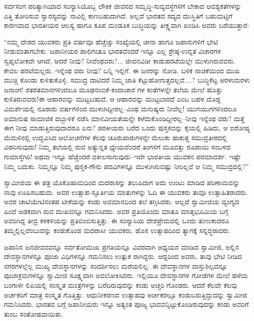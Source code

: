 ಸರ್ವಸಂಗ ಪರಿತ್ಯಾಗಿಯಾದ ಸಂನ್ಯಾಸಿಯೊಬ್ಬ ಲೌಕಿಕ ಜೀವನದ ಸಮೃದ್ಧಿ-ಸುವ್ಯವಸ್ಥೆಗಳಿಗೆ ಬೇಕಾದ ಆವಶ್ಯಕತೆಗಳನ್ನು ಎತ್ತಿ ತೋರಿಸುವ ಸ್ವಾರಸ್ಯವನ್ನು ನಾವಿಲ್ಲಿ ಕಾಣಬಹುದಾಗಿದೆ. ಅಲ್ಲದೆ ಭಾರತದ ಸದ್ಯದ ದುಃಸ್ಥಿತಿಗೆ ಬಹುಮಟ್ಟಿಗೆ ಕಾರಣವಾದ ಭಾರತೀಯರ ಆಲಸ್ಯ ಹಾಗೂ ಕೂಪ ಮಂಡೂಕ ಬುದ್ಧಿಯನ್ನು ತೀಕ್ಷ್ಣವಾಗಿ ಖಂಡಿಸಿ ಅವರು ಬರೆಯುತ್ತಾರೆ:

“ನಮ್ಮ ದೇಶದ ಯುವಕರು ಪ್ರತಿ ವರ್ಷವೂ ಹೆಚ್ಚೆಚ್ಚು ಸಂಖ್ಯೆಯಲ್ಲಿ ಚೀನಾ ಹಾಗೂ ಜಪಾನುಗಳಿಗೆ ಭೇಟಿ ನೀಡುವಂತಾಗಬೇಕು. ಜಪಾನೀಯರ ಪಾಲಿಗಂತೂ ಭಾರತವೆಂದರೆ ಇನ್ನೂ ಎಲ್ಲ ಶ್ರೇಷ್ಠ-ಉನ್ನತ ವಿಚಾರಗಳ ಸ್ವಪ್ನಲೋಕವೇ ಆಗಿದೆ. ಆದರೆ ನೀವು? ನೀವೆಂಥವರು?... ಜೀವನವಿಡೀ ಕಾಡುಹರಟೆಯಲ್ಲೇ ಮುಳುಗಿರುವವರು. ಕೇವಲ ಹರಟೆಮಲ್ಲರು. ಇನ್ನೆಂಥ ವರು ನೀವು? ಬನ್ನಿ ಇಲ್ಲಿಗೆ. ಈ ಜನರನ್ನು ನೋಡಿ. ಬಳಿಕ ನಾಚಿಕೆಯಿಂದ ಮುಖ ಮುಚ್ಚಿ ಕೊಂಡು ಕುಳಿತುಕೊಳ್ಳಿ. ಸಮುದ್ರ ದಾಟಿದರೆ ನಿಮ್ಮ ಜಾತಿ ಕೆಟ್ಟುಹೋಗುತ್ತದಲ್ಲವೆ....? ಬುದ್ಧಿಕೆಟ್ಟ ಅರಳುಮರಳು ಜನಾಂಗ! ಶತಶತಮಾನಗಳಿಂದಲೂ ಮೂಢನಂಬಿಕೆ-ಕಂದಾಚಾರ ಗಳ ಕಂತೆಗಳನ್ನೇ ತಲೆಯ ಮೇಲೆ ಹೊತ್ತು ಕುಳಿತಿರುವವರು!ಈ ಆಹಾರವನ್ನು ಮುಟ್ಟಬಹುದೆ, ಆ ಆಹಾರವನ್ನು ಮುಟ್ಟಬಾರದೆ ಎಂಬ ಬಹಳ ದೊಡ್ಡ ವಿಮರ್ಶೆಯಲ್ಲಿ ನೂರಾರು ವರ್ಷಗಳಿಂದ ಮುಳುಗಿದ್ದೀರಲ್ಲ–ಎಂಥ ಮನುಷ್ಯರು ನೀವೆಲ್ಲ! ಯುಗಯುಗಗಳಿಂದಲೂ ಅಮಾನುಷ ಸಾಮಾಜಿಕ ದಬ್ಬಾಳಿಕೆ ನಡೆಸಿ ಮಾನವೀಯತೆಯನ್ನೇ ಕಳೆದುಕೊಂಡಿದ್ದೀರಲ್ಲ–ನೀವು ಇನ್ನೆಂಥ ವರು? ಮತ್ತೆ ಈಗ ನೀವು ಮಾಡುತ್ತಿರುವುದಾದರೂ ಏನು? ಪರಕೀಯರು ಬರೆದ ಒಂದು ಪುಸ್ತಕವನ್ನು ಕೈಯಲ್ಲಿ ಹಿಡಿದು, ಆ ಐರೋಪ್ಯ ಮೆದುಳಿನಲ್ಲಿ ಉದ್ಭವಿಸಿದ ಆಲೋಚನೆಗಳ ಕೆಲವು ಚೂರುಪಾರುಗಳನ್ನೇ ಮೆಲುಕು ಹಾಕುತ್ತ ಸಮುದ್ರತೀರದಲ್ಲಿ ವಿಹರಿಸುವುದು! ನಿಮ್ಮ ತಲೆಯಲ್ಲಿ ರುವ ಅತ್ಯುನ್ನತ ಧ್ಯೇಯವೆಂದರೆ ತಿಂಗಳಿಗೆ ಮೂವತ್ತು ರೂಪಾಯಿ ಸಂಬಳದ ಗುಮಾಸ್ತೆಗಿರಿ! ಅಥವಾ ಇನ್ನೂ ಹೆಚ್ಚೆಂದರೆ ವಕೀಲನಾಗುವುದು–ಇದೇ ಭಾರತೀಯ ಯುವಕನ ಪರಮಾದರ್ಶ. ಇಷ್ಟೇ ನಿಮ್ಮ ಬದುಕು. ನಿಮ್ಮನ್ನೂ ನಿಮ್ಮ ಪುಸ್ತಕ-ಗೌನು ಪದವಿಗಳನ್ನೂ ಮುಳುಗಿಸುವಷ್ಟು ನೀರಿಲ್ಲವೆ ಆ ನಿಮ್ಮ ಸಮುದ್ರದಲ್ಲಿ?”

ಸ್ವಾಮೀಜಿಯ ಈ ಪತ್ರ ಯೊಕೊಹಾಮದಿಂದ ಮದರಾಸನ್ನು ತಲುಪಿದಾಗ ಅದು ಉಂಟು ಮಾಡಿದ ಪರಿಣಾಮವನ್ನು ನಾವು ಊಹಿಸಬಹುದು. ಅವರ ಉತ್ಸಾಹ-ಸ್ಫೂರ್ತಿಯ ಮಾತುಗಳನ್ನು ಓದಿ ಈ ಯುವಕರು ತಾವೂ ಉತ್ಸಾಹಿತರಾದರು. ಅವರ ಚಾಟಿಯೇಟಿನಂತಹ ಟೀಕೆಯನ್ನು ಕಂಡು ಅವಮಾನದಿಂದ ತಲೆ ತಗ್ಗಿಸಿದರು. ಅಲ್ಲದೆ ಸ್ವಾಮೀಜಿಯ ವ್ಯಂಗ್ಯದ ಹಿಂದೆ ಅಡಕವಾಗಿ ರುವ ದುಃಖವನ್ನೂ ಗಮನಿಸಿದರು. ಅವರ ಪ್ರತಿಯೊಂದು ಮಾತೂ ಮಾತೃಭೂಮಿಯ ಬಗ್ಗೆ ಅವರಿಗಿದ್ದ ತೀವ್ರ ಕಳಕಳಿಯನ್ನು ಪ್ರತಿಬಿಂಬಿಸುತ್ತಿತ್ತು. ಈ ಸಂನ್ಯಾಸಿಯ ದೇಶಪ್ರೇಮದಲ್ಲಿ ಒಂದು ತುಣುಕಾದರೂ ತಮ್ಮಲ್ಲಿಲ್ಲವೆಂಬುದನ್ನು ಕಂಡುಕೊಂಡ ಮದರಾಸೀ ಯುವಕರು, ಹೊಸ ಉತ್ಸಾಹದಿಂದ ತ್ಯಾಗಕ್ಕೆ ಸನ್ನದ್ಧರಾದರು.

ಜಪಾನಿನ ಜನಜೀವನವನ್ನೂ ಸರ್ವತೋಮುಖ ಪ್ರಗತಿಯನ್ನೂ ವಿವರವಾಗಿ ಅಧ್ಯಯನ ಮಾಡಿದ ಸ್ವಾಮೀಜಿ, ಅಲ್ಲಿನ ದೇವಸ್ಥಾನಗಳನ್ನೂ ಪೂಜಾ ವಿಧಿಗಳನ್ನೂ ಗಮನಿಸಲು ಉತ್ಸುಕ ರಾಗಿದ್ದರು. ಆದ್ದರಿಂದ ಅವರು, ತಾವು ಭೇಟಿ ನೀಡಿದ ನಗರಗಳಲ್ಲೆಲ್ಲ ಮುಖ್ಯ ದೇವಸ್ಥಾನಗಳನ್ನು ಸಂದರ್ಶಿಸಲು ಮರೆಯಲಿಲ್ಲ. ಈ ದೇವಸ್ಥಾನಗಳ ವಾಸ್ತುಶಿಲ್ಪವನ್ನೂ ಪೂಜಾಕ್ರಮಗಳನ್ನೂ ಸ್ವಾಮೀಜಿ ಸೂಕ್ಷ್ಮವಾಗಿ ಅವಲೋಕಿಸಿದರು. ಇಲ್ಲಿಯೂ ದೇವಸ್ಥಾನಗಳ ಗೋಡೆಗಳ ಮೇಲೆ ಹಳೆಯ ಬಂಗಾಳೀ ಲಿಪಿಯಲ್ಲಿ ಸಂಸ್ಕೃತ ಮಂತ್ರಗಳನ್ನು ಬರೆದಿರುವುದನ್ನು ಕಂಡು ಅಚ್ಚರಿ ಗೊಂಡರು. ಆದರೆ ಕೆಲವೇ ಕೆಲವು ಅರ್ಚಕರಿಗೆ ಮಾತ್ರ ಸಂಸ್ಕೃತ ಗೊತ್ತಿತ್ತು. ಆಧುನೀಕರಣದ ಉತ್ಸಾಹವು ಅರ್ಚಕರಲ್ಲೂ ಕಂಡುಬರುತ್ತಿದ್ದುದನ್ನು ಸ್ವಾಮೀಜಿ ಗಮನಿಸಿದರು. ಭಾರತದ ಬಗ್ಗೆ ಜಪಾನೀಯರು ಇನ್ನೂ ಅತ್ಯಂತ ಪೂಜ್ಯ ಭಾವವನ್ನಿಟ್ಟುಕೊಂಡಿರುವುದನ್ನು ಕಂಡು ಅವರಿಗೆ ತುಂಬ ಸಂತೋಷವಾಯಿತು.

